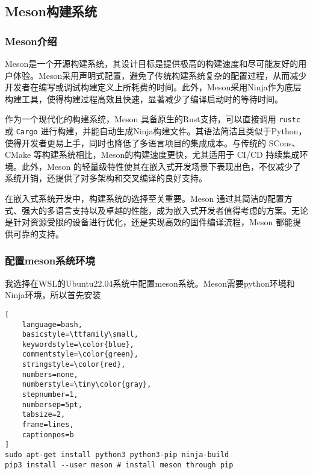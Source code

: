 

\subsection{Meson构建系统}
\subsubsection{Meson介绍}
\indent 
Meson是一个开源构建系统\cite{meson_system}，其设计目标是提供极高的构建速度和尽可能友好的用户体验。Meson采用声明式配置，避免了传统构建系统复杂的配置过程，从而减少开发者在编写或调试构建定义上所耗费的时间。此外，Meson采用Ninja作为底层构建工具，使得构建过程高效且快速，显著减少了编译启动时的等待时间。

\indent 作为一个现代化的构建系统\cite{Wiki_Meson}，Meson 具备原生的Rust支持，可以直接调用 \texttt{rustc} 或 \texttt{Cargo} 进行构建，并能自动生成Ninja构建文件。其语法简洁且类似于Python，使得开发者更易上手，同时也降低了多语言项目的集成成本。与传统的 SCons、CMake 等构建系统相比，Meson的构建速度更快，尤其适用于 CI/CD 持续集成环境。此外，Meson 的轻量级特性使其在嵌入式开发场景下表现出色\cite{embedded}，不仅减少了系统开销，还提供了对多架构和交叉编译的良好支持\cite{RioTian}。

\indent 在嵌入式系统开发中，构建系统的选择至关重要。Meson 通过其简洁的配置方式、强大的多语言支持以及卓越的性能，成为嵌入式开发者值得考虑的方案。无论是针对资源受限的设备进行优化，还是实现高效的固件编译流程，Meson 都能提供可靠的支持。

\subsubsection{配置meson系统环境}
\indent 我选择在WSL的Ubuntu22.04系统中配置meson系统。Meson需要python环境和Ninja环境\cite{meson_install}，所以首先安装
\begin{lstlisting}[
    language=bash,
    basicstyle=\ttfamily\small,
    keywordstyle=\color{blue},
    commentstyle=\color{green},
    stringstyle=\color{red},
    numbers=none,
    numberstyle=\tiny\color{gray},
    stepnumber=1,
    numbersep=5pt,
    tabsize=2,
    frame=lines,
    captionpos=b
]
sudo apt-get install python3 python3-pip ninja-build
pip3 install --user meson # install meson through pip
\end{lstlisting}


